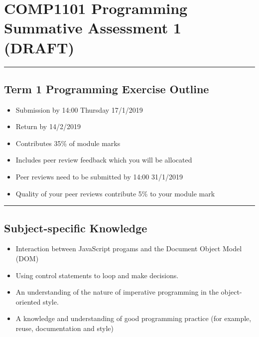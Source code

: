 \documentclass[]{article}
\date{}
\providecommand{\tightlist}{%
  \setlength{\itemsep}{0pt}\setlength{\parskip}{0pt}}
\begin{document}
\hypertarget{comp1101-programming-summative-assessment-1-draft}{%
\section{COMP1101 Programming Summative Assessment 1
(DRAFT)}\label{comp1101-programming-summative-assessment-1-draft}}

\begin{center}\rule{0.5\linewidth}{\linethickness}\end{center}

\hypertarget{term-1-programming-exercise-outline}{%
\subsection{Term 1 Programming Exercise
Outline}\label{term-1-programming-exercise-outline}}

\begin{itemize}
\tightlist
\item
  Submission by 14:00 Thursday 17/1/2019
\item
  Return by 14/2/2019
\item
  Contributes 35\% of module marks
\item
  Includes peer review feedback which you will be allocated
\item
  Peer reviews need to be submitted by 14:00 31/1/2019
\item
  Quality of your peer reviews contribute 5\% to your module mark
\end{itemize}

\begin{center}\rule{0.5\linewidth}{\linethickness}\end{center}

\hypertarget{subject-specific-knowledge}{%
\subsection{Subject-specific
Knowledge}\label{subject-specific-knowledge}}

\begin{itemize}
\tightlist
\item
  Interaction between JavaScript progams and the Document Object Model
  (DOM)
\item
  Using control statements to loop and make decisions.
\item
  An understanding of the nature of imperative programming in the
  object-oriented style.
\item
  A knowledge and understanding of good programming practice (for
  example, reuse, documentation and style)
\end{itemize}
\end{document}
